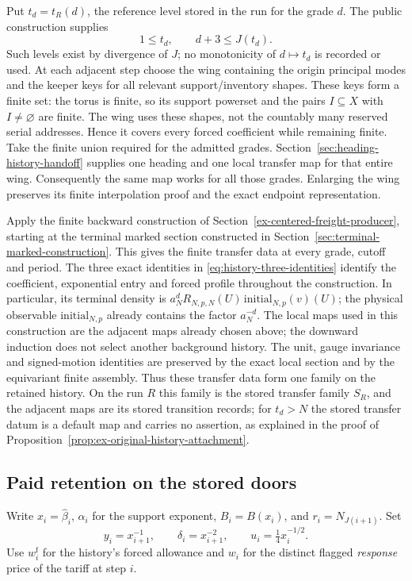Put $t_d=t_R(d)$, the reference level stored in the run for the grade
$d$. The public construction supplies
\[
                 1\le t_d,\qquad d+3\le J(t_d).
\]
Such levels exist by divergence of $J$; no monotonicity of
$d\mapsto t_d$ is recorded or used. At each adjacent step
choose the wing containing the origin principal modes and the keeper
keys for all relevant support/inventory shapes. These keys form a finite
set: the torus is finite, so its support powerset and the pairs
$I\subseteq X$ with $I\ne\varnothing$ are finite. The wing uses
these shapes, not the countably many reserved serial addresses. Hence
it covers every forced coefficient while remaining finite. Take the
finite union required for the admitted grades.
Section~\ref{sec:heading-history-handoff} supplies one heading and
one local transfer map for that entire wing. Consequently the same
map works for all those grades. Enlarging the wing preserves its
finite interpolation proof and the exact endpoint representation.

Apply the finite backward construction of
Section~\ref{ex-centered-freight-producer}, starting at the terminal
marked section constructed in Section~\ref{sec:terminal-marked-construction}. This gives the finite transfer data at every grade,
cutoff and period. The three exact identities in
\eqref{eq:history-three-identities} identify the coefficient,
exponential entry and forced profile throughout the construction.
In particular, its terminal density is
$a_N^d R_{N,p,N}(U)\,\mathrm{initial}_{N,p}(v)(U)$;
the physical observable $\mathrm{initial}_{N,p}$ already contains
the factor $a_N^{-d}$. The local maps used
in this construction are the adjacent maps already chosen above;
the downward induction does not select another background history.
The unit, gauge invariance and signed-motion identities are preserved
by the exact local section and by the equivariant finite assembly.
Thus these transfer data form one family on the retained history. On the
run $R$ this family is the stored transfer family $S_R$, and the adjacent
maps are its stored transition records; for $t_d>N$ the stored transfer
datum is a default map and carries no assertion, as explained in the
proof of Proposition~\ref{prop:ex-original-history-attachment}.

\subsection{Paid retention on the stored doors}

Write $x_i=\widehat\beta_i$, $\alpha_i$ for the support exponent,
$B_i=B(x_i)$, and $r_i=N_{J(i+1)}$. Set
\[
 y_i=x_{i+1}^{-1},\qquad \delta_i=x_{i+1}^{-2},
 \qquad u_i=\tfrac14 x_i^{-1/2}.
\]
Use $w_i^{\mathrm f}$ for the history's forced allowance and $w_i$ for
the distinct flagged \emph{response} price of the tariff at step $i$.

